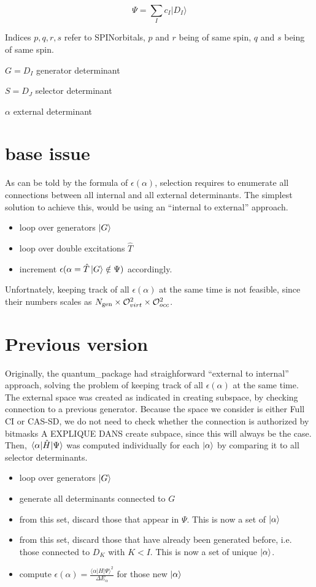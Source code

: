 \documentclass[./thesis.tex]{subfiles}
\begin{document}
\begin{equation}
\Psi = \sum_I {c_I | D_I \rangle}
\end{equation}


Indices $p,q,r,s$ refer to SPINorbitals, $p$ and $r$ being of same spin, $q$ and $s$ being of same spin. 


$G = D_I$ generator determinant

$S = D_J$ selector determinant

$\alpha$ external determinant

\section{base issue}
As can be told by the formula of $\epsilon(\alpha)$, selection requires to enumerate all connections between all internal and all external determinants.
The simplest solution to achieve this, would be using an ``internal to external'' approach.
\begin{itemize}
\item
loop over generators $\ket G$
\item
loop over double excitations $\hat T$
\item increment $\epsilon(\alpha = \hat T \ket G \notin \Psi)$ accordingly.

\end{itemize}
Unfortnately, keeping track of all $\epsilon(\alpha)$ at the same time is not feasible, since their numbers scales as ${N_\text{gen}} \times \mathcal{O}_{virt}^2 \times \mathcal{O}_{occ}^2$.


\section{Previous version}

Originally, the quantum\_package had straighforward ``external to internal'' approach, solving the problem of keeping track of all $\epsilon(\alpha)$ at the same time. The external space was created as indicated in \alert{creating subspace}, by checking connection to a previous generator. Because the space we consider is either Full CI or CAS-SD, we do not need to check whether the connection is authorized by bitmasks  \alert{A EXPLIQUE DANS create subpace}, since this will always be the case. Then, $\mel{\alpha}{\hat{H}}{\Psi}$ was computed individually for each ${\ket{\alpha}}$ by comparing it to all selector determinants.

\begin{itemize}
\item
loop over generators $\ket G$
\item
generate all determinants connected to $G$
\item
from this set, discard those that appear in $\Psi$. This is now a set of $\ket \alpha$
\item
from this set, discard those that have already been generated before, i.e. those connected to $D_K$ with $K<I$. This is now a set of unique $\ket \alpha$.
\item
compute $\epsilon(\alpha) = \frac{\langle \alpha|H|\Psi\rangle^2}{\Delta E_\alpha}$ for those new $\ket \alpha$
\end{itemize}
\end{document}
